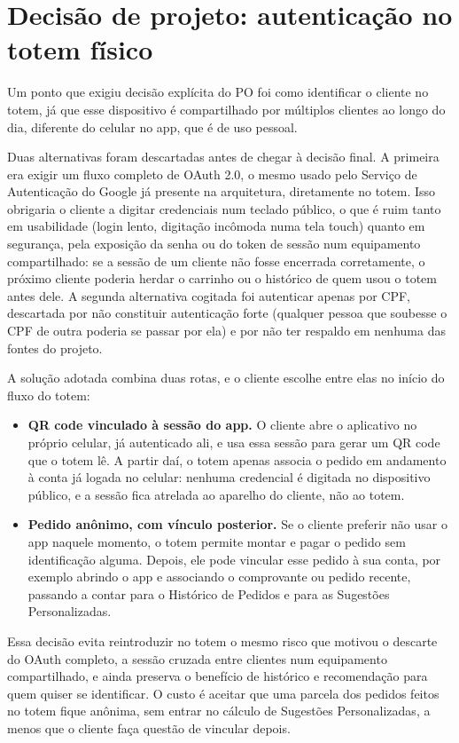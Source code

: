 \documentclass[a4paper,12pt,oneside,openany]{book}
\begin{document}
\section{Decisão de projeto: autenticação no totem físico}

Um ponto que exigiu decisão explícita do PO foi como identificar o cliente no totem, já que esse dispositivo é compartilhado por múltiplos clientes ao longo do dia, diferente do celular no app, que é de uso pessoal.

Duas alternativas foram descartadas antes de chegar à decisão final. A primeira era exigir um fluxo completo de OAuth 2.0, o mesmo usado pelo Serviço de Autenticação do Google já presente na arquitetura, diretamente no totem. Isso obrigaria o cliente a digitar credenciais num teclado público, o que é ruim tanto em usabilidade (login lento, digitação incômoda numa tela touch) quanto em segurança, pela exposição da senha ou do token de sessão num equipamento compartilhado: se a sessão de um cliente não fosse encerrada corretamente, o próximo cliente poderia herdar o carrinho ou o histórico de quem usou o totem antes dele. A segunda alternativa cogitada foi autenticar apenas por CPF, descartada por não constituir autenticação forte (qualquer pessoa que soubesse o CPF de outra poderia se passar por ela) e por não ter respaldo em nenhuma das fontes do projeto.

A solução adotada combina duas rotas, e o cliente escolhe entre elas no início do fluxo do totem:

\begin{itemize}
    \item \textbf{QR code vinculado à sessão do app.} O cliente abre o aplicativo no próprio celular, já autenticado ali, e usa essa sessão para gerar um QR code que o totem lê. A partir daí, o totem apenas associa o pedido em andamento à conta já logada no celular: nenhuma credencial é digitada no dispositivo público, e a sessão fica atrelada ao aparelho do cliente, não ao totem.
    \item \textbf{Pedido anônimo, com vínculo posterior.} Se o cliente preferir não usar o app naquele momento, o totem permite montar e pagar o pedido sem identificação alguma. Depois, ele pode vincular esse pedido à sua conta, por exemplo abrindo o app e associando o comprovante ou pedido recente, passando a contar para o Histórico de Pedidos e para as Sugestões Personalizadas.
\end{itemize}

Essa decisão evita reintroduzir no totem o mesmo risco que motivou o descarte do OAuth completo, a sessão cruzada entre clientes num equipamento compartilhado, e ainda preserva o benefício de histórico e recomendação para quem quiser se identificar. O custo é aceitar que uma parcela dos pedidos feitos no totem fique anônima, sem entrar no cálculo de Sugestões Personalizadas, a menos que o cliente faça questão de vincular depois.
\end{document}
